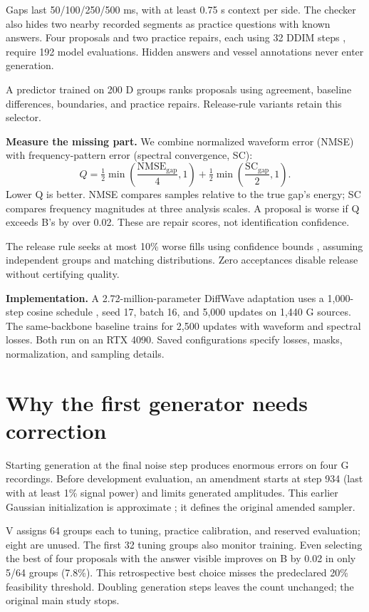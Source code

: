 \documentclass[runningheads,orivec]{llncs}
\begin{document}
Gaps last 50/100/250/500 ms, with at least 0.75 s context per side. The checker also hides two nearby recorded segments as practice questions with known answers. Four proposals and two practice repairs, each using 32 DDIM steps \cite{ddim}, require 192 model evaluations. Hidden answers and vessel annotations never enter generation.

A predictor trained on 200 D groups ranks proposals using agreement, baseline differences, boundaries, and practice repairs. Release-rule variants retain this selector.

\textbf{Measure the missing part.} We combine normalized waveform error (NMSE) with frequency-pattern error (spectral convergence, SC):
\begin{equation}
Q=\tfrac12\min\!\left(\frac{\mathrm{NMSE}_{\mathrm{gap}}}{4},1\right)+\tfrac12\min\!\left(\frac{\mathrm{SC}_{\mathrm{gap}}}{2},1\right).\label{eq:quality}
\end{equation}
Lower Q is better. NMSE compares samples relative to the true gap's energy; SC compares frequency magnitudes at three analysis scales. A proposal is worse if Q exceeds B's by over 0.02. These are repair scores, not identification confidence.

The release rule seeks at most 10\% worse fills using confidence bounds \cite{ltt}, assuming independent groups and matching distributions. Zero acceptances disable release without certifying quality.

\textbf{Implementation.} A 2.72-million-parameter DiffWave adaptation uses a 1,000-step cosine schedule \cite{nichol}, seed 17, batch 16, and 5,000 updates on 1,440 G sources. The same-backbone baseline trains for 2,500 updates with waveform and spectral losses. Both run on an RTX 4090. Saved configurations specify losses, masks, normalization, and sampling details.

\section{Why the first generator needs correction}

Starting generation at the final noise step produces enormous errors on four G recordings. Before development evaluation, an amendment starts at step 934 (last with at least 1\% signal power) and limits generated amplitudes. This earlier Gaussian initialization is approximate \cite{lin}; it defines the original amended sampler.

V assigns 64 groups each to tuning, practice calibration, and reserved evaluation; eight are unused. The first 32 tuning groups also monitor training. Even selecting the best of four proposals with the answer visible improves on B by 0.02 in only 5/64 groups (7.8\%). This retrospective best choice misses the predeclared 20\% feasibility threshold. Doubling generation steps leaves the count unchanged; the original main study stops.
\end{document}
